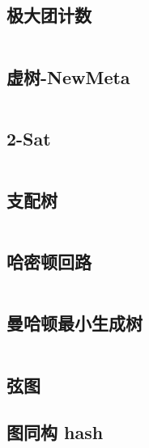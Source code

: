 \subsection{极大团计数}
\inputminted[breaklines]{cpp}{./graph-theory/maximum-clique-counting.cpp}
\subsection{虚树-NewMeta}
\inputminted[breaklines]{cpp}{./graph-theory/virtual-tree-NewMeta.cpp}
\subsection{2-Sat}
\inputminted[breaklines]{cpp}{./graph-theory/2-sat.cpp}
\subsection{支配树}
\inputminted[breaklines]{cpp}{./graph-theory/dominator-tree.cpp}

\subsection{哈密顿回路}
\inputminted[breaklines]{cpp}{./graph-theory/hamilton-loop.tex}
\subsection{曼哈顿最小生成树}
\inputminted[breaklines]{cpp}{./graph-theory/manhattan-minimum-spanning-tree.tex}

\subsection{弦图}

\subsection{图同构 hash}
